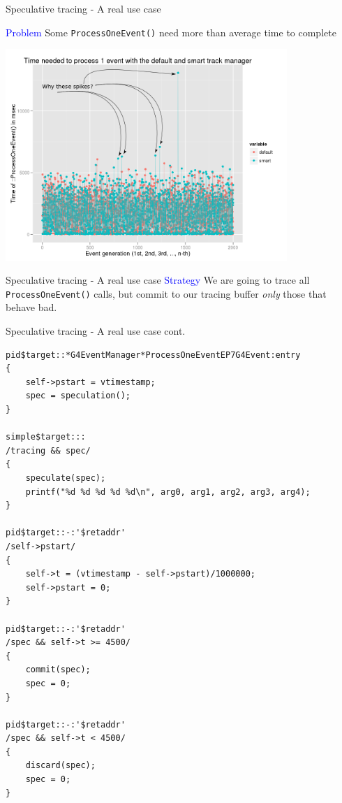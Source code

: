 \documentclass{beamer}
\begin{document}
\begin{frame}{Speculative tracing - A real use case}

\textcolor{blue}{Problem} Some {\tt ProcessOneEvent()} need more than average time to complete

\begin{center}
  \includegraphics[width=0.8\textwidth]{evts1-arrows.png}
\end{center}
\end{frame}

\begin{frame}{Speculative tracing - A real use case}
\textcolor{blue}{Strategy} We are going to trace all {\tt ProcessOneEvent()} calls, but commit to our tracing
buffer \textit{only} those that behave bad.
\end{frame}

\begin{frame}[fragile]{Speculative tracing - A real use case cont.}
\lstset{basicstyle=\tiny\ttfamily}
\lstset{frame=single, columns=flexible}
\begin{lstlisting}
pid$target::*G4EventManager*ProcessOneEventEP7G4Event:entry
{
    self->pstart = vtimestamp;
    spec = speculation();
}

simple$target:::
/tracing && spec/
{
    speculate(spec);
    printf("%d %d %d %d %d\n", arg0, arg1, arg2, arg3, arg4);
}

pid$target::-:'$retaddr'
/self->pstart/
{
    self->t = (vtimestamp - self->pstart)/1000000;
    self->pstart = 0;
}

pid$target::-:'$retaddr'
/spec && self->t >= 4500/
{
    commit(spec);
    spec = 0;
}

pid$target::-:'$retaddr'
/spec && self->t < 4500/
{
    discard(spec);
    spec = 0;
}
\end{lstlisting}
\end{frame}
\end{document}

